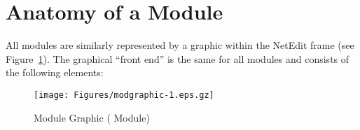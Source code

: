 \section{Anatomy of a Module}
\label{sec:modanatomy}

\newcommand{\modgraphic}{%
  \centerline{\texttt{[image: Figures/modgraphic-1.eps.gz]}}
}
\begin{htmlonly}
  \newcommand{\modgraphic}{%
  \htmladdimg[alt="SCIRun Module Graphic"]{../Figures/modgraphic-1.gif}
}
\end{htmlonly}

All modules  are similarly represented by a graphic within the NetEdit frame
(see Figure~\ref{fig:modgraphic}). The graphical ``front end'' is the same
for all modules and consists of the following elements:

\begin{figure}[htb]
  \begin{makeimage}
  \end{makeimage}
  \modgraphic
  \caption{\label{fig:modgraphic} Module Graphic ( Module)}
\end{figure}

